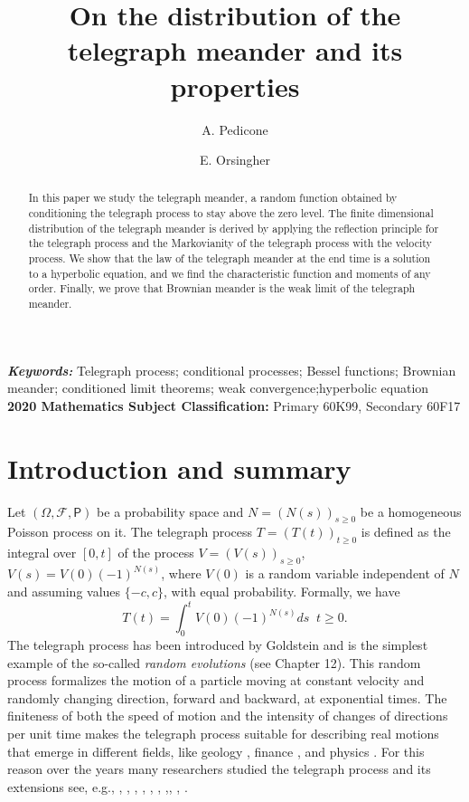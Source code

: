 \documentclass{article}
\title{On the distribution of the telegraph meander and its properties}
\author[1]{A. Pedicone}
\author[2]{E. Orsingher}
\affil[ ]{Department of Statistical Sciences, Sapienza University of Rome, Italy}
\affil[1]{andrea.pedicone@uniroma1.it}
\affil[2]{enzo.orsingher@uniroma1.it}
\date{}
\theoremstyle{definition}
\numberwithin{equation}{section}
\providecommand{\msc}[1]{\small	\textbf{2020 Mathematics Subject Classification:} #1}
\providecommand{\keywords}[1]
{\small	\textbf{\textit{Keywords:}} #1}
\begin{document}
\maketitle
\begin{abstract}
In this paper we study the telegraph meander, a random function obtained by conditioning the telegraph process to stay above the zero level. The finite dimensional distribution of the telegraph meander is derived by applying the reflection principle for the telegraph process and the Markovianity of the telegraph process with the velocity process. We show that the law of the telegraph meander at the end time is a solution to a hyperbolic equation, and we find the characteristic function and moments of any order. Finally, we prove that Brownian meander is the weak limit of the telegraph meander.
\end{abstract}
\keywords{Telegraph process; conditional processes; Bessel functions; Brownian meander; conditioned limit theorems; weak convergence;hyperbolic equation}
\\
\msc{Primary 60K99, Secondary 60F17}
\section{Introduction and summary}
Let $(\Omega, \mathcal{F},\mathsf{P})$ be a probability space and $N = (N(s))_{s\geq 0}$ be a homogeneous Poisson process on it. The telegraph process $T = (T(t))_{t\geq 0}$ is defined as the integral over $[0,t]$ of the process $V = (V(s))_{s\geq 0}$, $V(s) = V(0)(-1)^{N(s)}$, where $V(0)$ is a random variable independent of $N$ and assuming values $\{-c,c\}$, with equal probability. Formally, we have
\begin{equation}\label{telegraph process}
T(t) = \int_0^tV(0)(-1)^{N(s)}ds \;\; t \geq 0.
\end{equation}
The telegraph process has been introduced by Goldstein \cite{G 1951} and is the simplest example of the so-called \textit{random evolutions} (see \cite{EK 1986} Chapter 12). This random process formalizes the motion of a particle moving  at constant velocity and randomly changing direction, forward and backward, at exponential times. The finiteness of both the speed of motion and the intensity of changes of directions per unit time makes the telegraph process suitable for describing real motions that emerge in different fields, like geology \cite{TDc 2018}, finance \cite{DcP 2002, R 2007}, and physics \cite{HM 2020, MADlB2012}. For this reason over the years many researchers studied the telegraph process and its extensions see, e.g., \cite{O 1990}, \cite{O 1995}, \cite{R 1999}, \cite{R 2021}, \cite{BNO 2001}, \cite{DGO 2004}, \cite{DgI 2021} ,\cite{Dc 2001}, \cite{C 2023}, \cite{CO 2021}.
\end{document}
